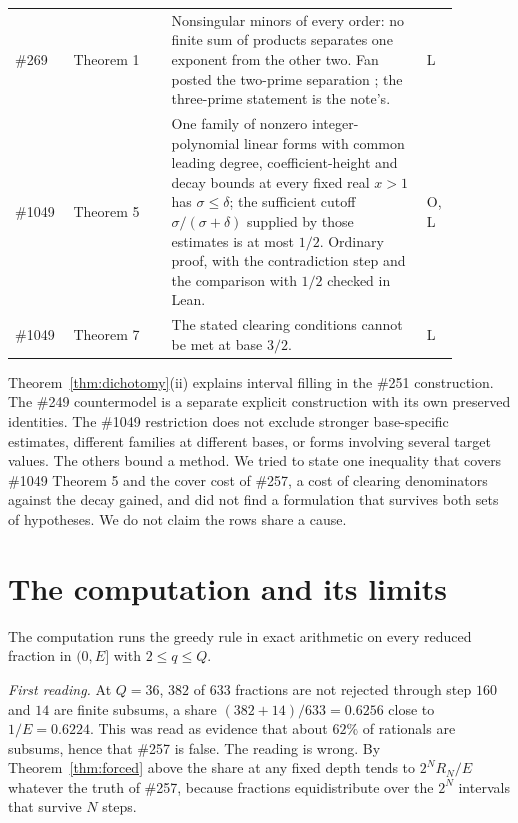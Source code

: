 \documentclass[11pt]{article}
\begin{document}
\begin{longtable}{p{0.10\linewidth}p{0.20\linewidth}p{0.52\linewidth}p{0.06\linewidth}}
\#269 \cite{plectis269} & Theorem 1 & Nonsingular minors of every order: no finite sum of products separates one exponent from the other two.  Fan posted the two-prime separation \cite{fan2026comment}; the three-prime statement is the note's. & L \\
\#1049 \cite{plectis1049} & Theorem 5 & One family of nonzero integer-polynomial linear forms with common leading degree, coefficient-height and decay bounds at every fixed real $x>1$ has $\sigma\le\delta$; the sufficient cutoff $\sigma/(\sigma+\delta)$ supplied by those estimates is at most $1/2$.  Ordinary proof, with the contradiction step and the comparison with $1/2$ checked in Lean. & O, L \\
\#1049 \cite{plectis1049} & Theorem 7 & The stated clearing conditions cannot be met at base $3/2$. & L \\
\hline
\end{longtable}

Theorem~\ref{thm:dichotomy}(ii) explains interval filling in the \#251 construction.
The \#249 countermodel is a separate explicit construction with its own
preserved identities.  The \#1049 restriction does not exclude stronger
base-specific estimates, different families at different bases, or forms
involving several target values.
The others bound a method.  We tried to state one inequality that covers
\#1049 Theorem 5 and the cover cost of \#257, a cost of clearing denominators
against the decay gained, and did not find a formulation that survives both
sets of hypotheses.  We do not claim the rows share a cause.


\section{The computation and its limits}\label{sec:misread}

The computation \cite{plectisinvestigation} runs the greedy rule in exact
arithmetic on every reduced fraction in $(0,E]$ with $2\le q\le Q$.

\emph{First reading.}  At $Q=36$, $382$ of $633$ fractions are not rejected
through step $160$ and $14$ are finite subsums, a share $(382+14)/633=0.6256$
close to $1/E=0.6224$.  This was read as evidence that about $62\%$ of rationals are
subsums, hence that \#257 is false.  The reading is wrong.  By Theorem~\ref{thm:forced} above the share at any fixed depth tends to $2^NR_N/E$ whatever the truth of
\#257, because fractions equidistribute over the $2^N$ intervals that survive
$N$ steps.
\end{document}
